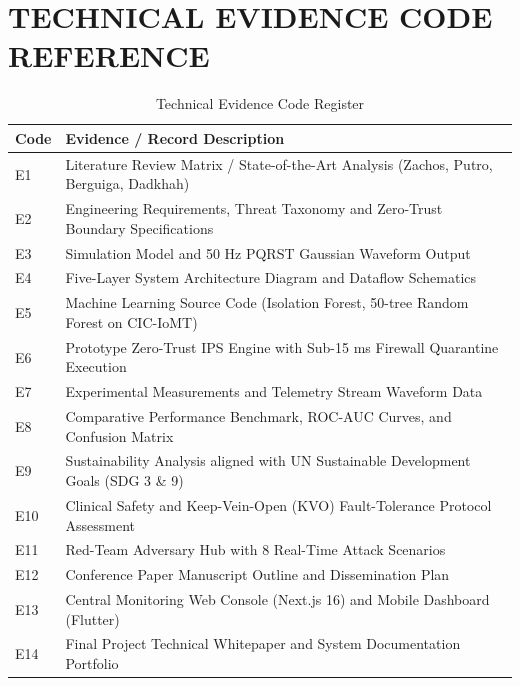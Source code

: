 \documentclass[12pt,a4paper]{report}
\begin{document}
\chapter{TECHNICAL EVIDENCE CODE REFERENCE}
\begin{table}[h]
\centering
\caption{Technical Evidence Code Register}
\label{tab:app_c}
\vspace{0.3cm}
\begin{tabular}{|l|p{12cm}|}
\hline
\textbf{Code} & \textbf{Evidence / Record Description} \\
\hline
E1 & Literature Review Matrix / State-of-the-Art Analysis (Zachos, Putro, Berguiga, Dadkhah) \\
E2 & Engineering Requirements, Threat Taxonomy and Zero-Trust Boundary Specifications \\
E3 & Simulation Model and 50 Hz PQRST Gaussian Waveform Output \\
E4 & Five-Layer System Architecture Diagram and Dataflow Schematics \\
E5 & Machine Learning Source Code (Isolation Forest, 50-tree Random Forest on CIC-IoMT) \\
E6 & Prototype Zero-Trust IPS Engine with Sub-15 ms Firewall Quarantine Execution \\
E7 & Experimental Measurements and Telemetry Stream Waveform Data \\
E8 & Comparative Performance Benchmark, ROC-AUC Curves, and Confusion Matrix \\
E9 & Sustainability Analysis aligned with UN Sustainable Development Goals (SDG 3 \& 9) \\
E10 & Clinical Safety and Keep-Vein-Open (KVO) Fault-Tolerance Protocol Assessment \\
E11 & Red-Team Adversary Hub with 8 Real-Time Attack Scenarios \\
E12 & Conference Paper Manuscript Outline and Dissemination Plan \\
E13 & Central Monitoring Web Console (Next.js 16) and Mobile Dashboard (Flutter) \\
E14 & Final Project Technical Whitepaper and System Documentation Portfolio \\
\hline
\end{tabular}
\end{table}
\end{document}
